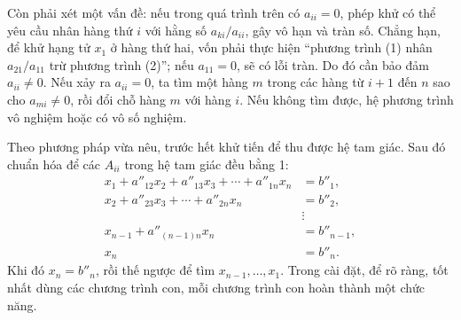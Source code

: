 \documentclass[11pt]{article}
\begin{document}
\begin{center}
\end{center}

Còn phải xét một vấn đề: nếu trong quá trình trên có \(a_{ii}=0\), phép khử
có thể yêu cầu nhân hàng thứ \(i\) với hằng số \(a_{ki}/a_{ii}\), gây vô hạn
và tràn số. Chẳng hạn, để khử hạng tử \(x_1\) ở hàng thứ hai, vốn phải thực
hiện ``phương trình (1) nhân \(a_{21}/a_{11}\) trừ phương trình (2)''; nếu
\(a_{11}=0\), sẽ có lỗi tràn. Do đó cần bảo đảm \(a_{ii}\ne 0\). Nếu xảy ra
\(a_{ii}=0\), ta tìm một hàng \(m\) trong các hàng từ \(i+1\) đến \(n\) sao
cho \(a_{mi}\ne0\), rồi đổi chỗ hàng \(m\) với hàng \(i\). Nếu không tìm được,
hệ phương trình vô nghiệm hoặc có vô số nghiệm.

Theo phương pháp vừa nêu, trước hết khử tiến để thu được hệ tam giác. Sau đó
chuẩn hóa để các \(A_{ii}\) trong hệ tam giác đều bằng 1:
\[
\begin{aligned}
  x_1+a''_{12}x_2+a''_{13}x_3+\cdots+a''_{1n}x_n&=b''_1,\\
  x_2+a''_{23}x_3+\cdots+a''_{2n}x_n&=b''_2,\\
  &\vdots\\
  x_{n-1}+a''_{(n-1)n}x_n&=b''_{n-1},\\
  x_n&=b''_n.
\end{aligned}
\]
Khi đó \(x_n=b''_n\), rồi thế ngược để tìm \(x_{n-1},\ldots,x_1\). Trong cài
đặt, để rõ ràng, tốt nhất dùng các chương trình con, mỗi chương trình con
hoàn thành một chức năng.
\end{document}
